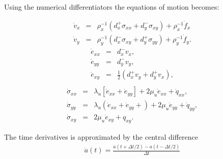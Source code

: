 \documentclass[11pt]{article}
\begin{document}
Using the numerical differentiators the equations of motion becomes:

\begin{eqnarray}
  \dot{v}_x & = & \rho^{-1}_x\left(d^+_x \sigma_{xx} +d^-_y \sigma_{xy}\right) 
             +   \rho^{-1}_x \dot{f}_x  \\
  \dot{v}_y & = & \rho^{-1}_y\left(d^-_x \sigma_{xy} +d^+_y \sigma_{yy}\right) 
             +   \rho^{-1}_y \dot{f}_y. 
\end{eqnarray}
\begin{eqnarray}
    \dot{e}_{xx} & = & d^-_x v_x, \nonumber \\
    \dot{e}_{yy} & = & d^-_y v_y, \nonumber \\
    \dot{e}_{xy} & = & \frac{1}{2}(d^+_x v_y + d^+_y v_x),\nonumber\\
                \label{eq:strains}
\end{eqnarray}
\begin{eqnarray}
  \dot{\sigma}_{xx} 
     & = & \lambda_u \left [\dot{e}_{xx} 
                 + \dot{e}_{yy} \right]
                 + 2\mu_u \dot{e}_{xx} +\dot{q}_{xx},           \nonumber\\ 
  \dot{\sigma}_{yy} 
     & = & \lambda_u \left (\dot{e}_{xx} 
                 +\dot{e}_{yy} + \right)
                 + 2\mu_u \dot{e}_{yy} +\dot{q}_{yy},           \nonumber\\
  \dot{\sigma}_{xy} 
    & = & 2\mu_u \dot{e}_{xy} +q_{xy}.                          \nonumber 
\end{eqnarray}

The time derivatives is approximated by the central difference
\begin{eqnarray}
\dot{a}(t) = \frac{a(t+\Delta t/2) - a(t-\Delta t/2)}{\Delta t}
                      \label{eq:time-derivative}
\end{eqnarray}
\end{document}
